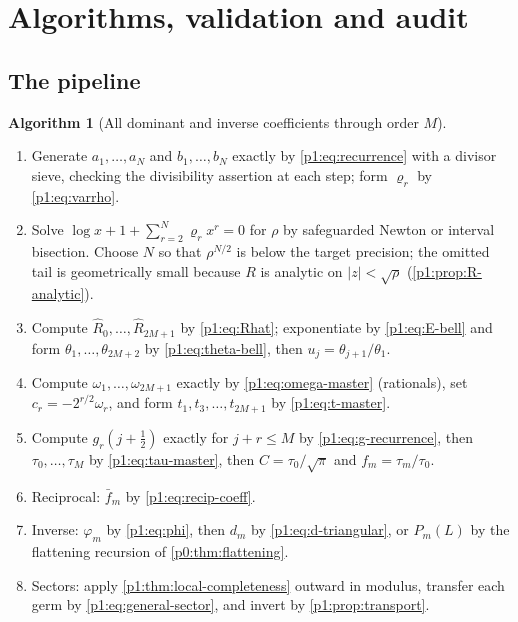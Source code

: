 \documentclass[11pt,a4paper,oneside]{book}
\theoremstyle{plain}
\theoremstyle{definition}
\newtheorem{algorithm}[theorem]{Algorithm}
\theoremstyle{remark}
\begin{document}
\section{Algorithms, validation and audit}
\label{p1:sec:algorithms}

\subsection{The pipeline}

\begin{algorithm}[All dominant and inverse coefficients through order $M$]
\label{p1:alg:pipeline}
\leavevmode
\begin{enumerate}
\item Generate $a_1,\ldots,a_N$ and $b_1,\ldots,b_N$ exactly by
      \cref{p1:eq:recurrence} with a divisor sieve, checking the divisibility
      assertion at each step; form $\varrho_r$ by \cref{p1:eq:varrho}.
\item Solve $\log x+1+\sum_{r=2}^{N}\varrho_rx^{r}=0$ for $\rho$ by
      safeguarded Newton or interval bisection.  Choose $N$ so that
      $\rho^{N/2}$ is below the target precision; the omitted tail is
      geometrically small because $R$ is analytic on $|z|<\sqrt\rho$
      (\cref{p1:prop:R-analytic}).
\item Compute $\widehat R_0,\ldots,\widehat R_{2M+1}$ by
      \cref{p1:eq:Rhat}; exponentiate by \cref{p1:eq:E-bell} and form
      $\theta_1,\ldots,\theta_{2M+2}$ by \cref{p1:eq:theta-bell}, then
      $u_j=\theta_{j+1}/\theta_1$.
\item Compute $\omega_1,\ldots,\omega_{2M+1}$ exactly by
      \cref{p1:eq:omega-master} (rationals), set $c_r=-2^{r/2}\omega_r$, and
      form $t_1,t_3,\ldots,t_{2M+1}$ by \cref{p1:eq:t-master}.
\item Compute $g_r(j+\tfrac12)$ exactly for $j+r\le M$ by
      \cref{p1:eq:g-recurrence}, then $\tau_0,\ldots,\tau_M$ by
      \cref{p1:eq:tau-master}, then $C=\tau_0/\sqrt\pi$ and
      $f_m=\tau_m/\tau_0$.
\item Reciprocal: $\bar f_m$ by \cref{p1:eq:recip-coeff}.
\item Inverse: $\varphi_m$ by \cref{p1:eq:phi}, then $d_m$ by
      \cref{p1:eq:d-triangular}, or $P_m(L)$ by the flattening recursion of
      \cref{p0:thm:flattening}.
\item Sectors: apply \cref{p1:thm:local-completeness} outward in modulus,
      transfer each germ by \cref{p1:eq:general-sector}, and invert by
      \cref{p1:prop:transport}.
\end{enumerate}
\end{algorithm}
\end{document}
